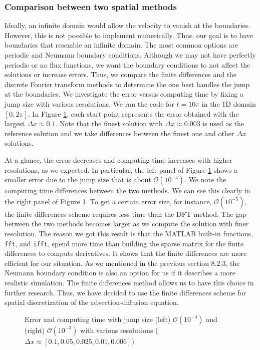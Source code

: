 \subsubsection{Comparison between two spatial methods}
Ideally, an infinite domain would allow the velocity to vanish at the boundaries. 
However, this is not possible to implement numerically. Thus, our goal is to have boundaries that resemble an infinite domain. The most common options are periodic and Neumann boundary conditions. Although we may not have perfectly periodic or no flux functions, we want the boundary conditions to not affect the solutions or increase errors. 
Thus, we compare the finite differences and the discrete Fourier transform methods to determine the one best handles the jump at the boundaries. We investigate the error versus computing time by fixing a jump size with various resolutions. We ran the code for $t = 10 \pi$ in the 1D domain $[0, 2\pi].$ In Figure \ref{fig_precision}, each start point represents the error obtained with the largest $\Delta x \approx 0.1$. Note that the finest solution with $\Delta x \approx 0.003$ is used as the reference solution and we take differences between the finest one and other $\Delta x$ solutions.  
\par
At a glance, the error decreases and computing time increases with higher resolutions, as we expected. In particular, the left panel of Figure \ref{fig_precision} shows a smaller error due to the jump size that is about $\mathcal{O}(10^{-4})$.
We note the computing time differences between the two methods. We can see this clearly in the right panel of Figure \ref{fig_precision}. To get a certain error size, for instance, $\mathcal{O}(10^{-5})$, the finite differences scheme requires less time than the DFT method. The gap between the two methods becomes larger as we compute the solution with finer resolution.  
The reason we got this result is that the MATLAB built-in functions, \verb+fft+, and \verb+ifft+, spend more time than building the sparse matrix for the finite differences to compute derivatives. It shows that the finite differences are more efficient for our situation. As we mentioned in the previous section 8.2.3, the Neumann boundary condition is also an option for us if it describes a more realistic simulation. 
The finite differences method allows us to have this choice in further research. 
Thus, we have decided to use the finite differences scheme for spatial discretization of the advection-diffusion equation.
\begin{figure}[ht]
	\begin{center}
	\end{center}
	\caption{Error and computing time with jump size (left) $\mathcal{O}(10^{-4})$ and (right) $\mathcal{O}(10^{-3})$ with various resolutions ($\Delta x \approx [0.1, 0.05, 0.025, 0.01, 0.006])$}
	\label{fig_precision}
\end{figure}

